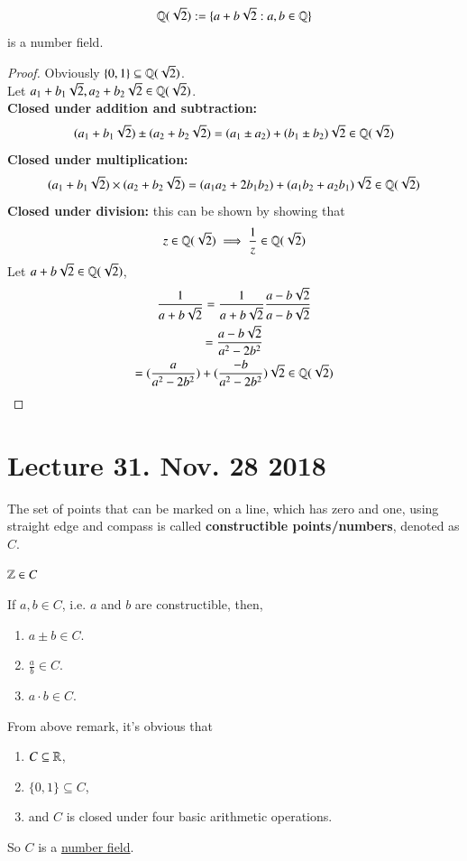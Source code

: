 \documentclass[10pt]{article}
\begin{document}
		\begin{example}
			\[
				\mathbb{Q}(\sqrt{2}) := \{a+b\sqrt{2}:a,b\in\mathbb{Q}\}
			\]
			is a number field.
		\end{example}
		\begin{proof}
			Obviously $\{0, 1\} \subseteq \mathbb{Q}(\sqrt{2})$. \\
			Let $a_1 + b_1 \sqrt{2}, a_2 + b_2 \sqrt{2} \in \mathbb{Q}(\sqrt{2})$. \\
			\textbf{Closed under addition and subtraction: }
			\[
				(a_1 + b_1 \sqrt{2}) \pm (a_2 + b_2 \sqrt{2}) = (a_1 \pm a_2) + (b_1 \pm b_2)\sqrt{2} \in \mathbb{Q}(\sqrt{2})
			\]
			\textbf{Closed under multiplication: }
			\[
				(a_1 + b_1 \sqrt{2}) \times (a_2 + b_2 \sqrt{2}) = (a_1 a_2 + 2 b_1 b_2) + (a_1 b_2 + a_2 b_1)\sqrt{2} \in \mathbb{Q}(\sqrt{2})
			\]
			\textbf{Closed under division: } this can be shown by showing that 
			\[
				z \in \mathbb{Q}(\sqrt{2}) \implies \frac{1}{z} \in \mathbb{Q}(\sqrt{2})
			\]
			Let $a + b \sqrt{2} \in \mathbb{Q}(\sqrt{2})$,
			\begin{gather*}
				\frac{1}{a+b\sqrt{2}} = \frac{1}{a+b\sqrt{2}} \frac{a-b\sqrt{2}}{a-b\sqrt{2}} \\
				= \frac{a-b\sqrt{2}}{a^2 - 2b^2} \\
				= (\frac{a}{a^2 - 2b^2}) + (\frac{-b}{a^2 - 2b^2})\sqrt{2} \in \mathbb{Q}(\sqrt{2})
			\end{gather*}
		\end{proof}
	\section{Lecture 31. Nov. 28 2018}
		\begin{definition}
			The set of points that can be marked on a line, which has zero and one, using straight edge and compass is called \textbf{constructible points/numbers}, denoted as $C$.
		\end{definition}
		
		\begin{example}
			$\mathbb{Z} \in C$
		\end{example}
		
		\begin{remark}
			If $a, b \in C$, i.e. $a$ and $b$ are constructible, then,
			\begin{enumerate}
				\item $a \pm b \in C$.
				\item $\frac{a}{b} \in C$.
				\item $a \cdot b \in C$.
			\end{enumerate}
		\end{remark}
		\begin{proposition}
			From above remark, it's obvious that 
			\begin{enumerate}
				\item $C \subseteq \mathbb{R}$,
				\item $\{0, 1\} \subseteq C$,
				\item and $C$ is closed under four basic arithmetic operations.
			\end{enumerate}
			So $C$ is a \ul{number field}.
		\end{proposition}
		
\end{document}
